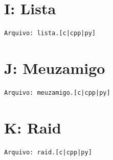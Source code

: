 \documentclass[12pt,oneside]{article} %
\begin{document}
\newpage
\section*{I: Lista} %
\vspace{-0.52cm}
\noindent \begin{verbatim}Arquivo: lista.[c|cpp|py]\end{verbatim}


\newpage
\section*{J: Meuzamigo} %
\vspace{-0.52cm}
\noindent \begin{verbatim}Arquivo: meuzamigo.[c|cpp|py]\end{verbatim}


\newpage
\section*{K: Raid} %
\vspace{-0.52cm}
\noindent \begin{verbatim}Arquivo: raid.[c|cpp|py]\end{verbatim}

\end{document}
